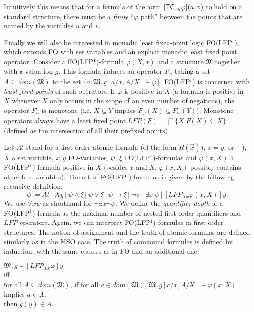 \documentclass{LMCS}
\newcommand{\frM}{\mathfrak{M}}
\newcommand{\fo}{\textsf{FO}\xspace}
\newcommand{\mso}{\textsf{MSO}\xspace}
\newcommand{\folfp}{\textsf{FO(LFP$^1$)}\xspace}
\newcommand{\tc}{\textrm{\sf TC}\xspace}
\begin{document}
Intuitively this means that for a formula of the form $[\tc_{xy}
\varphi](u,v)$ to hold on a standard structure, there must be a
\emph{finite} ``$\varphi$ path'' between the points that are named
by the variables $u$ and $v$.

Finally we will also be interested in monadic least fixed-point logic
\folfp, which extends \fo with set variables and an explicit
monadic least fixed point operator. Consider a \folfp-formula
$\varphi(X,x)$ and a structure $\frM$ together with a valuation $g$.
This formula induces an operator $F_\varphi$ taking a set $A
\subseteq dom(\frM)$ to the set $\{a:\frM, g[a/x,A/X] \models
\varphi\}$. \folfp is concerned with \emph{least fixed points} of such
operators. If $\varphi$ is positive in $X$ (a formula is positive in
$X$ whenever $X$ only occurs in the scope of an even number of
negations), the operator $F_\varphi$ is monotone (i.e. $X \subseteq
Y$ implies $F_\varphi(X) \subseteq F_\varphi(Y)$). Monotone operators
always have a least fixed point $LFP(F)=\bigcap \{X|F(X)\subseteq X\}$
(defined as the intersection of all
their prefixed points).

\begin{defi}
[Syntax and semantics of \folfp]
    Let $At$ stand for a first-order atomic formula  (of the form
    $R(\vec{x}))$, $x=y$, or $\top$), $X$ a set variable, $x,y$ \fo-variables, $\psi$, $\xi$ \folfp-formulas and $\varphi(x,X)$
    a \folfp-formula positive in $X$ (besides $x$ and $X$, $\varphi(x,X)$ possibly contains other free variables).
    The set of \folfp formulas is given by the following recursive definition:
$$\psi:= At ~|~ Xy ~|~ \psi \wedge \xi ~|~ \psi \vee \xi ~|~ \psi
\rightarrow \xi ~|~ \neg \psi ~|~ \exists x~ \psi ~|~
[LFP_{Xx}\varphi(x,X)]y ~$$
We use $\forall x \psi$ as shorthand for $\neg \exists x \neg
\psi$. We define the \textit{quantifier depth} of a \folfp-formula as the
maximal number of nested first-order quantifiers and $LFP$ operators.
Again, we can interpret \folfp-formulas in first-order structures. The
notion of assignment and the truth of atomic formulas are defined similarly
as in the \mso case. The truth of compound formulas is defined by induction,
with the same clauses as in \fo and an additional one:
\begin{center}
$\frM, g \models [LFP_{Xx}\varphi]y$\\
iff\\
for all $A \subseteq dom(\frM)$, if for all $a \in dom(\frM)$, $\frM, g[a/x,A/X]
\models \varphi(x,X)$ implies $a \in A$,\\
then $g(y)\in A$.
\end{center}
\end{defi}
\end{document}
